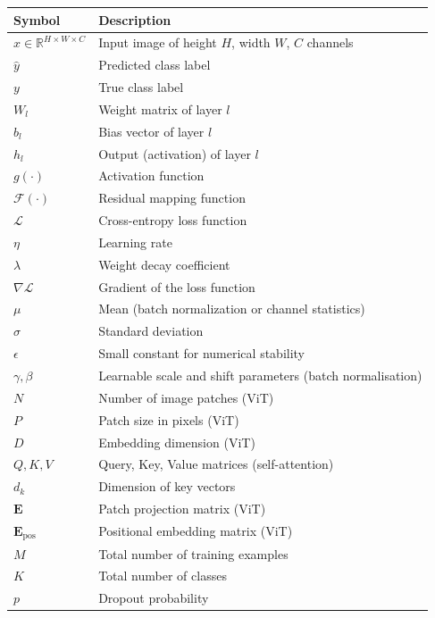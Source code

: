 \documentclass[12pt, letterpaper]{article}
\begin{document}
\begin{tabular}{@{}L{3.5cm} L{9.5cm}@{}}
    \toprule
    \textbf{Symbol} & \textbf{Description} \\
    \midrule
    $x \in \mathbb{R}^{H \times W \times C}$ & Input image of height $H$, width $W$, $C$ channels \\
    $\hat{y}$           & Predicted class label \\
    $y$                 & True class label \\
    $W_l$               & Weight matrix of layer $l$ \\
    $b_l$               & Bias vector of layer $l$ \\
    $h_l$               & Output (activation) of layer $l$ \\
    $g(\cdot)$          & Activation function \\
    $\mathcal{F}(\cdot)$& Residual mapping function \\
    $\mathcal{L}$       & Cross-entropy loss function \\
    $\eta$              & Learning rate \\
    $\lambda$           & Weight decay coefficient \\
    $\nabla \mathcal{L}$& Gradient of the loss function \\
    $\mu$               & Mean (batch normalization or channel statistics) \\
    $\sigma$            & Standard deviation \\
    $\epsilon$          & Small constant for numerical stability \\
    $\gamma, \beta$     & Learnable scale and shift parameters (batch normalisation) \\
    $N$                 & Number of image patches (ViT) \\
    $P$                 & Patch size in pixels (ViT) \\
    $D$                 & Embedding dimension (ViT) \\
    $Q, K, V$           & Query, Key, Value matrices (self-attention) \\
    $d_k$               & Dimension of key vectors \\
    $\mathbf{E}$        & Patch projection matrix (ViT) \\
    $\mathbf{E}_{\text{pos}}$ & Positional embedding matrix (ViT) \\
    $M$                 & Total number of training examples \\
    $K$                 & Total number of classes \\
    $p$                 & Dropout probability \\
    \bottomrule
\end{tabular}
\end{document}
